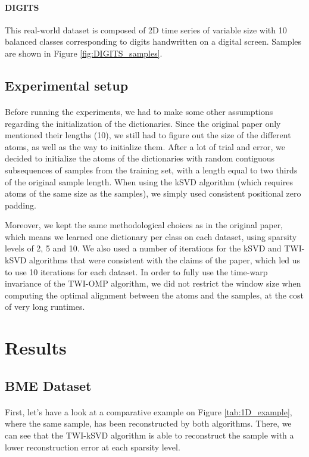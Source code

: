 \documentclass[11pt]{article}
\begin{document}
\paragraph{DIGITS} This real-world dataset is composed of 2D time series of variable size with 10 balanced classes corresponding to digits handwritten on a digital screen. Samples are shown in Figure \ref{fig:DIGITS_samples}.

\subsection{Experimental setup}

\paragraph{} Before running the experiments, we had to make some other assumptions regarding the initialization of the dictionaries. Since the original paper only mentioned their lengths (10), we still had to figure out the size of the different atoms, as well as the way to initialize them. After a lot of trial and error, we decided to initialize the atoms of the dictionaries with random contiguous subsequences of samples from the training set, with a length equal to two thirds of the original sample length. When using the kSVD algorithm (which requires atoms of the same size as the samples), we simply used consistent positional zero padding.

Moreover, we kept the same methodological choices as in the original paper, which means we learned one dictionary per class on each dataset, using sparsity levels of 2, 5 and 10. We also used a number of iterations for the kSVD and TWI-kSVD algorithms that were consistent with the claims of the paper, which led us to use 10 iterations for each dataset. In order to fully use the time-warp invariance of the TWI-OMP algorithm, we did not restrict the window size when computing the optimal alignment between the atoms and the samples, at the cost of very long runtimes.

\section{Results}

\subsection{BME Dataset}

\paragraph{} First, let's have a look at a comparative example on Figure \ref{tab:1D_example}, where the same sample, has been reconstructed by both algorithms. There, we can see that the TWI-kSVD algorithm is able to reconstruct the sample with a lower reconstruction error at each sparsity level. 
\end{document}
